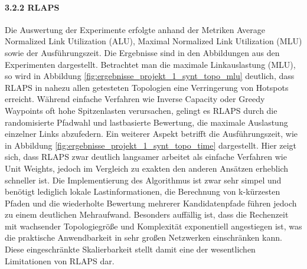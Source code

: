 \documentclass[sigconf,nonacm,review,language=english,language=german]{acmart}
\begin{document}
        \paragraph{3.2.2   RLAPS}
            Die Auswertung der Experimente erfolgte anhand der Metriken Average Normalized Link Utilization (ALU), Maximal Normalized Link Utilization (MLU) sowie der Ausführungszeit. Die Ergebnisse sind in den Abbildungen aus den Experimenten dargestellt. Betrachtet man die maximale Linkauslastung (MLU), so wird in Abbildung \ref{fig:ergebnisse_projekt_1_synt_topo_mlu} deutlich, dass RLAPS in nahezu allen getesteten Topologien  eine Verringerung von Hotspots erreicht. Während einfache Verfahren wie Inverse Capacity oder Greedy Waypoints oft hohe Spitzenlasten verursachen, gelingt es RLAPS durch die randomisierte Pfadwahl und lastbasierte Bewertung, die maximale Auslastung einzelner Links abzufedern.
            Ein weiterer Aspekt betrifft die Ausführungszeit, wie in Abbildung \ref{fig:ergebnisse_projekt_1_synt_topo_time} dargestellt. Hier zeigt sich, dass RLAPS zwar deutlich langsamer arbeitet als einfache Verfahren wie Unit Weights, jedoch im Vergleich zu exakten den anderen Ansätzen erheblich schneller ist. Die Implementierung des Algorithmus ist zwar sehr simpel und benötigt lediglich lokale Lastinformationen, die Berechnung von k-kürzesten Pfaden und die wiederholte Bewertung mehrerer Kandidatenpfade führen jedoch zu einem deutlichen Mehraufwand. Besonders auffällig ist, dass die Rechenzeit mit wachsender Topologiegröße und Komplexität exponentiell angestiegen ist, was die praktische Anwendbarkeit in sehr großen Netzwerken einschränken kann. Diese eingeschränkte Skalierbarkeit stellt damit eine der wesentlichen Limitationen von RLAPS dar.
        
\end{document}
